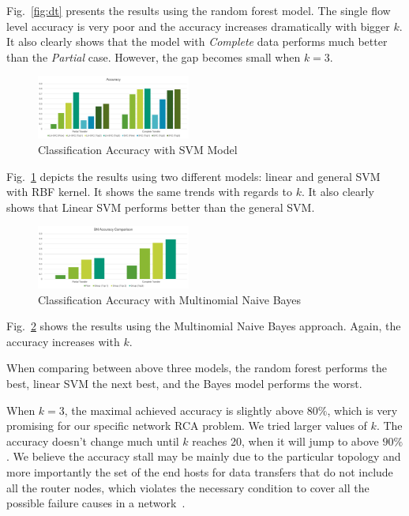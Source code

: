 Fig.~\ref{fig:dt} presents the results using the random forest model. The single flow level accuracy is very poor and the accuracy increases dramatically with bigger $k$. It also clearly shows that the model with {\it Complete} data performs much better than the {\it Partial} case. However, the gap becomes small when $k=3$. 

\begin{figure}[!ht]
\begin{center}
\includegraphics[width=0.45\textwidth]{./figure/svm-result}
\end{center}
\vspace{-0.05in}
\caption{Classification Accuracy with SVM Model}
\vspace{-0.05in}
\label{fig:svm}
\end{figure}

Fig.~\ref{fig:svm} depicts the results using two different models: linear and general SVM with RBF kernel. It shows the same trends with regards to $k$. It also clearly shows that Linear SVM performs better than the general SVM.
\begin{figure}[!ht]
\begin{center}
\includegraphics[width=0.45\textwidth]{./figure/bn-result}
\end{center}
\vspace{-0.05in}
\caption{Classification Accuracy with Multinomial Naive Bayes}
\vspace{-0.05in}
\label{fig:bn}
\end{figure}

Fig.~\ref{fig:bn} shows the results using the Multinomial Naive Bayes approach. Again, the accuracy increases with $k$.

When comparing between above three models, the random forest performs the best, linear SVM the next best, and the Bayes model performs the worst. 

When $k=3$, the maximal achieved accuracy is slightly above $80\%$, which is very promising for our specific network RCA problem. We tried larger values of $k$. The accuracy doesn't change much until $k$ reaches 20, when it will jump to above $90\%$. We believe the accuracy stall may be mainly due to the particular topology and more importantly the set of the end hosts for data transfers that do not include all the router nodes, which violates the necessary condition to cover all the possible failure causes in a network~\cite{netbouncer:nsdi18}.  

